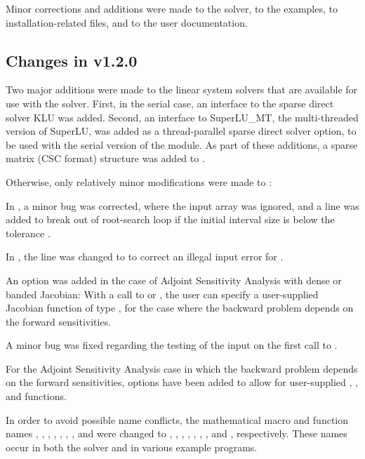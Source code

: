 Minor corrections and additions were made to the {\idas} solver, to the
examples, to installation-related files, and to the user documentation.


\subsection*{Changes in v1.2.0}

Two major additions were made to the linear system solvers that are
available for use with the {\idas} solver.  First, in the serial case,
an interface to the sparse direct solver KLU was added.
Second, an interface to SuperLU\_MT, the multi-threaded version of
SuperLU, was added as a thread-parallel sparse direct solver option,
to be used with the serial version of the {\nvector} module.
As part of these additions, a sparse matrix (CSC format) structure
was added to {\idas}.

Otherwise, only relatively minor modifications were made to {\idas}:

In , a minor bug was corrected, where the input
array  was ignored, and a line was added to break out of
root-search loop if the initial interval size is below the tolerance
.

In , the line  was changed to
 to correct an illegal input error for .

An option was added in the case of Adjoint Sensitivity Analysis with
dense or banded Jacobian:  With a call to  or
, the user can specify a user-supplied Jacobian
function of type , for the case where the backward
problem depends on the forward sensitivities.

A minor bug was fixed regarding the testing of the input  on
the first call to .

For the Adjoint Sensitivity Analysis case in which the backward problem
depends on the forward sensitivities, options have been added to allow
for user-supplied , , and  functions.

In order to avoid possible name conflicts, the mathematical macro
and function names , , , , ,
, , and  were changed to
, , , , ,
, , and , respectively.
These names occur in both the solver and in various example programs.

